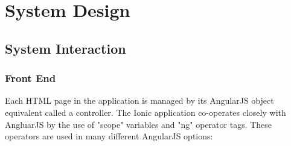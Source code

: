\section{System Design}

\subsection{System Interaction}
\subsubsection{Front End}
    Each HTML page in the application is managed by its AngularJS object equivalent called a controller.
    The Ionic application co-operates closely with AngluarJS by the use of "scope" variables and "ng" operator tags.
    These operators are used in many different AngularJS options:

